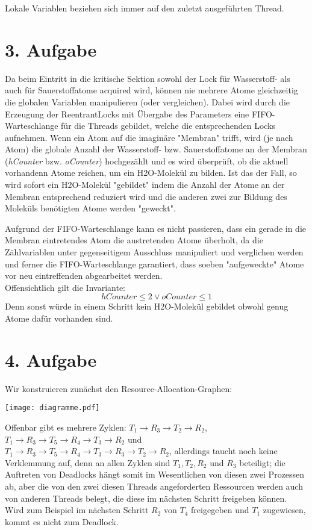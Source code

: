 \documentclass[numbers=noendperiod]{scrartcl}
\begin{document}
	Lokale Variablen beziehen sich immer auf den zuletzt ausgeführten Thread.

\section*{3. Aufgabe}
	
	Da beim Eintritt in die kritische Sektion sowohl der Lock für Wasserstoff- als auch für Sauerstoffatome acquired wird, können nie mehrere Atome gleichzeitig die globalen Variablen manipulieren (oder vergleichen). Dabei wird durch die Erzeugung der ReentrantLocks mit Übergabe des Parameters  eine FIFO-Warteschlange für die Threads gebildet, welche die entsprechenden Locks aufnehmen. Wenn ein Atom auf die imaginäre "Membran" trifft, wird (je nach Atom) die globale Anzahl der Wasserstoff- bzw. Sauerstoffatome an der Membran (\textit{hCounter} bzw. \textit{oCounter}) hochgezählt und es wird überprüft, ob die aktuell vorhandenn Atome reichen, um ein H2O-Molekül zu bilden. Ist das der Fall, so wird sofort ein H2O-Molekül "gebildet" indem die Anzahl der Atome an der Membran entsprechend reduziert wird und die anderen zwei zur Bildung des Moleküls benötigten Atome werden "geweckt".
	
	Aufgrund der FIFO-Warteschlange kann es nicht passieren, dass ein gerade in die Membran eintretendes Atom die austretenden Atome überholt, da die Zählvariablen unter gegenseitigem Ausschluss manipuliert und verglichen werden und ferner die FIFO-Warteschlange garantiert, dass soeben "aufgeweckte" Atome vor neu eintreffenden abgearbeitet werden.\\
	
	Offensichtlich gilt die Invariante:
	\begin{equation}
		hCounter \le 2 \lor oCounter \le 1
	\end{equation}
	Denn sonst würde in einem Schritt kein H2O-Molekül gebildet obwohl genug Atome dafür vorhanden sind.
	
	\section*{4. Aufgabe}
	
	Wir konstruieren zunächst den Resource-Allocation-Graphen:
	
	\texttt{[image: diagramme.pdf]}
	
	
	Offenbar gibt es mehrere Zyklen:
	$T_1 \to R_3 \to T_2 \to R_2$, $T_1 \to R_3 \to T_5 \to R_4 \to T_3 \to R_2$ und $T_1 \to R_3 \to T_5 \to R_4 \to T_3 \to R_3 \to T_2 \to R_2$, allerdings taucht noch keine Verklemmung auf, denn an allen Zyklen sind $T_1, T_2, R_2$ und $R_3$ beteiligt; die Auftreten von Deadlocks hängt somit im Wesentlichen von diesen zwei Prozessen ab, aber die von den zwei diesen Threads angeforderten Ressourcen werden auch von anderen Threads belegt, die diese im nächsten Schritt freigeben können. Wird zum Beispiel im nächsten Schritt $R_2$ von $T_4$ freigegeben und $T_1$ zugewiesen, kommt es nicht zum Deadlock.
	
\end{document}
